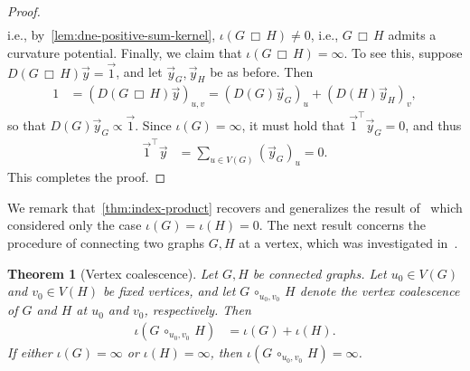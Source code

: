 \documentclass[11pt,a4paper]{article}
\newcommand{\distmatrix}{D}
\newcommand{\y}{\vec{y}}
\newcommand{\one}{\vec{1}}
\newtheorem{theorem}{Theorem}[section]
\newcommand{\Circ}{\circ}
\begin{document}
\begin{proof}
\begin{align*}
            \end{align*}
        i.e., by~\cref{lem:dne-positive-sum-kernel}, $\iota(G\,\Box\,H)\ne 0$, i.e., $G\,\Box\,H$ admits a curvature potential. Finally, we claim that $\iota(G\,\Box\,H)= \infty$. To see this, suppose $\distmatrix({G\,\Box\,H}) \y = \one$, and let $\y_G, \y_H$ be as before. Then
            \begin{align*}
                1 &= (\distmatrix({G\,\Box\, H})\y)_{u, v} = (\distmatrix(G) \y_G)_{u} + (\distmatrix(H) \y_H)_{v},
            \end{align*}
        so that $\distmatrix(G) \y_G \propto \one$. Since $\iota(G) = \infty$, it must hold that $\one^\top \y_G = 0$, and thus
            \begin{align*}
                \one^\top \y &= \sum_{u\in V(G)} (\y_G)_u = 0.
            \end{align*}
        This completes the proof.
    \end{proof}

    We remark that~\cref{thm:index-product} recovers and generalizes the result of~\cite[Thm. 6]{dudarov2023image} which considered only the case $\iota(G) = \iota(H) = 0$. The next result concerns the procedure of connecting two graphs $G, H$ at a vertex, which was investigated in~\cite{chen2023steinerberger}.

    \begin{theorem}[Vertex coalescence]\label{thm:merging}
        Let $G, H$ be connected graphs. Let $u_{0}\in V(G)$ and $v_{0}\in V(H)$ be fixed vertices, and let $G\,\Circ_{u_{0},v_{0}}\,H$ denote the vertex coalescence of $G$ and $H$ at $u_{0}$ and $v_{0}$, respectively. Then
            \begin{align*}
                \iota(G\,\Circ_{u_{0},v_{0}}\,H) &= \iota(G) + \iota(H).
            \end{align*}
        If either $\iota(G) = \infty$ or $\iota(H) = \infty$, then $\iota(G\,\Circ_{u_{0},v_{0}}\,H)=\infty$.
    \end{theorem}
\end{document}

